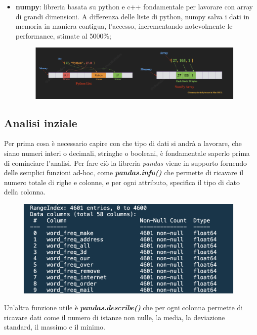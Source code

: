 \documentclass[12pt,a4paper]{article}
\begin{document}
\begin{itemize}
    \item \textbf{numpy}: libreria basata su python e c++ fondamentale per lavorare con array di grandi dimensioni. A differenza delle liste di python, numpy salva i dati in memoria in maniera contigua, l'accesso, incrementando notevolmente le performance, stimate al 5000\%;
    \begin{figure}[h]
        \includegraphics[width=1\linewidth]{numpy_vs_list.png}
        \caption{}
    \end{figure}

\end{itemize}

\clearpage
\subsection{Analisi inziale}
Per prima cosa è necessario capire con che tipo di dati si andrà a lavorare, che siano numeri interi o decimali, stringhe o booleani, è fondamentale saperlo prima di cominciare l'analisi.
Per fare ciò la libreria \textit{pandas} viene in supporto fornendo delle semplici funzioni ad-hoc, come\textbf{ \textit{pandas.info()}} che permette di ricavare il numero totale di righe e colonne, e per ogni attributo, specifica il tipo di dato della colonna.
\begin{figure}[h]
    \includegraphics[width=1\columnwidth]{pandas_info.png}
    \caption{}
\end{figure}
Un'altra funzione utile è \textit{\textbf{pandas.describe()}} che per ogni colonna permette di ricavare dati come il numero di istanze non nulle, la media, la deviazione standard, il massimo e il minimo.
\end{document}
